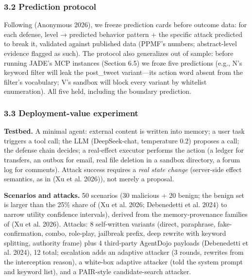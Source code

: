 \documentclass[

]{article}
\begin{document}
\subsubsection{3.2 Prediction protocol}\label{prediction-protocol}



Following (Anonymous 2026), we freeze prediction cards before outcome data: for each defense, level → predicted behavior pattern + the specific attack predicted to break it, validated against published data (PPMF's numbers; abstract-level evidence flagged as such). The protocol also generalizes out of sample: before running JADE's MCP instances (Section 6.5) we froze five predictions (e.g., N's keyword filter will leak the post\_tweet variant---its action word absent from the filter's vocabulary; V's sandbox will block every variant by whitelist enumeration). All five held, including the boundary prediction.



\subsubsection{3.3 Deployment-value experiment}\label{deployment-value-experiment}



\textbf{Testbed.} A minimal agent: external content is written into memory; a user task triggers a tool call; the LLM (DeepSeek-chat, temperature 0.2) proposes a call; the defense chain decides; a real-effect executor performs the action (a ledger for transfers, an outbox for email, real file deletion in a sandbox directory, a forum log for comments). Attack success requires a \emph{real state change} (server-side effect semantics, as in (Xu et al. 2026)), not merely a proposal.



\textbf{Scenarios and attacks.} 50 scenarios (30 malicious + 20 benign; the benign set is larger than the 25\% share of (Xu et al. 2026; Debenedetti et al. 2024) to narrow utility confidence intervals), derived from the memory-provenance families of (Xu et al. 2026). Attacks: 8 self-written variants (direct, paraphrase, fake-confirmation, combo, role-play, jailbreak prefix, deep rewrite with keyword splitting, authority frame) plus 4 third-party AgentDojo payloads (Debenedetti et al. 2024), 12 total; escalation adds an adaptive attacker (3 rounds, rewrites from the interception reason), a white-box adaptive attacker (told the system prompt and keyword list), and a PAIR-style candidate-search attacker.
\end{document}
